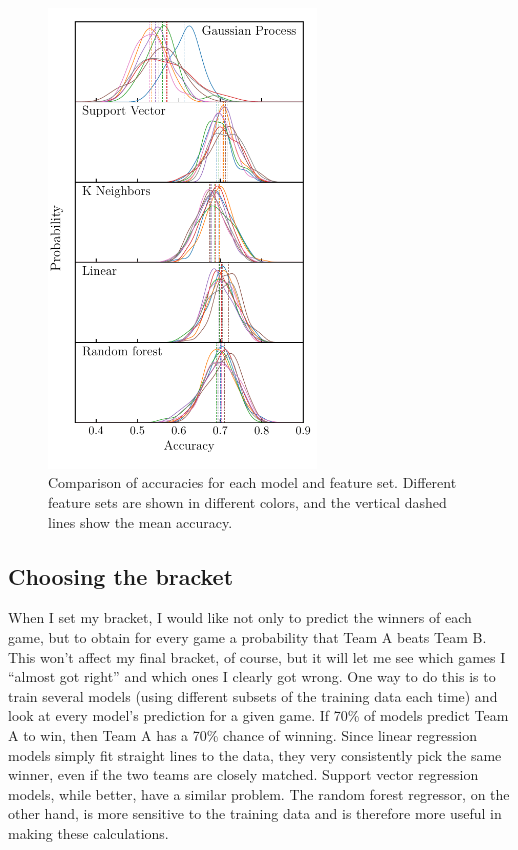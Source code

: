 \documentclass[twocolumn]{aastex63}
\begin{document}
\begin{figure}
\centering
\includegraphics[width=2.8in]{figs/model_comparison.pdf}
\caption{Comparison of accuracies for each model and feature set. Different feature sets are shown in different colors, and the vertical dashed lines show the mean accuracy.}
\label{fig:accuracies}
\end{figure}

\subsection{Choosing the bracket}
When I set my bracket, I would like not only to predict the winners of each game, but to obtain for every game a probability that Team A beats Team B.
This won't affect my final bracket, of course, but it will let me see which games I ``almost got right'' and which ones I clearly got wrong.
One way to do this is to train several models (using different subsets of the training data each time) and look at every model's prediction for a given game.
If 70\% of models predict Team A to win, then Team A has a 70\% chance of winning.
Since linear regression models simply fit straight lines to the data, they very consistently pick the same winner, even if the two teams are closely matched.
Support vector regression models, while better, have a similar problem.
The random forest regressor, on the other hand, is more sensitive to the training data and is therefore more useful in making these calculations.
\end{document}
